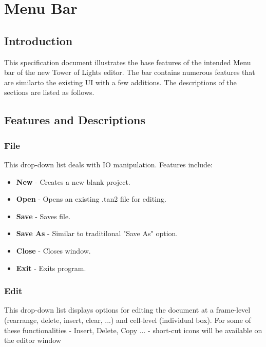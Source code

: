 \documentclass[]{article}
\begin{document}
\section{Menu Bar}



\subsection{Introduction}

{This specification document illustrates the base features of the intended Menu bar of the new Tower of Lights editor. The bar contains numerous features that are similarto the existing UI with a few additions. The descriptions of the sections are listed as follows.}

\subsection{Features and Descriptions}

\subsubsection{File}

{This drop-down list deals with IO manipulation. Features include:}

\begin{itemize}
\item \textbf{New} - Creates a new blank project. 
\item \textbf{Open} - Opens an existing .tan2 file for editing.
\item \textbf{Save} - Saves file.
\item \textbf{Save As} - Similar to traditilonal "Save As" option.
\item \textbf{Close} - Closes window. 
\item \textbf{Exit} - Exits program.

\end{itemize}

\subsubsection{Edit}

{This drop-down list displays options for editing the document at a frame-level (rearrange, delete, insert, clear, ...) and cell-level (individual box). For some of these functionalities - Insert, Delete, Copy ... - short-cut icons will be available on the editor window}
\end{document}
